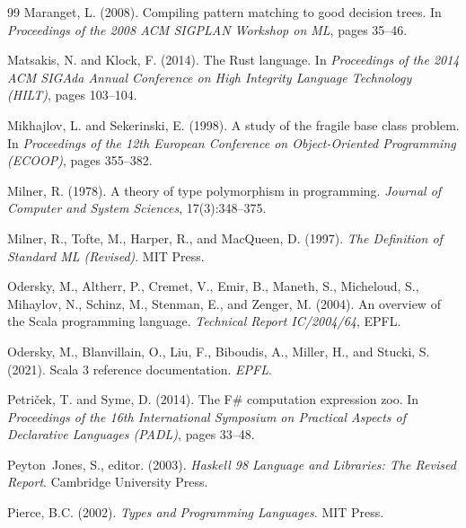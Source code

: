 \documentclass[11pt,a4paper]{article}
\begin{document}
\begin{thebibliography}{99}
Maranget, L. (2008).
\newblock Compiling pattern matching to good decision trees.
\newblock In \emph{Proceedings of the 2008 ACM SIGPLAN Workshop on ML}, pages 35--46.

Matsakis, N. and Klock, F. (2014).
\newblock The Rust language.
\newblock In \emph{Proceedings of the 2014 ACM SIGAda Annual Conference on High Integrity Language Technology (HILT)}, pages 103--104.

Mikhajlov, L. and Sekerinski, E. (1998).
\newblock A study of the fragile base class problem.
\newblock In \emph{Proceedings of the 12th European Conference on Object-Oriented Programming (ECOOP)}, pages 355--382.

Milner, R. (1978).
\newblock A theory of type polymorphism in programming.
\newblock \emph{Journal of Computer and System Sciences}, 17(3):348--375.

Milner, R., Tofte, M., Harper, R., and MacQueen, D. (1997).
\newblock \emph{The Definition of Standard ML (Revised)}.
\newblock MIT Press.

Odersky, M., Altherr, P., Cremet, V., Emir, B., Maneth, S., Micheloud, S., Mihaylov, N., Schinz, M., Stenman, E., and Zenger, M. (2004).
\newblock An overview of the Scala programming language.
\newblock \emph{Technical Report IC/2004/64}, EPFL.

Odersky, M., Blanvillain, O., Liu, F., Biboudis, A., Miller, H., and Stucki, S. (2021).
\newblock Scala 3 reference documentation.
\newblock \emph{EPFL}.

Petri\v{c}ek, T. and Syme, D. (2014).
\newblock The F\# computation expression zoo.
\newblock In \emph{Proceedings of the 16th International Symposium on Practical Aspects of Declarative Languages (PADL)}, pages 33--48.

Peyton~Jones, S., editor. (2003).
\newblock \emph{Haskell 98 Language and Libraries: The Revised Report}.
\newblock Cambridge University Press.

Pierce, B.C. (2002).
\newblock \emph{Types and Programming Languages}.
\newblock MIT Press.


\end{thebibliography}
\end{document}
